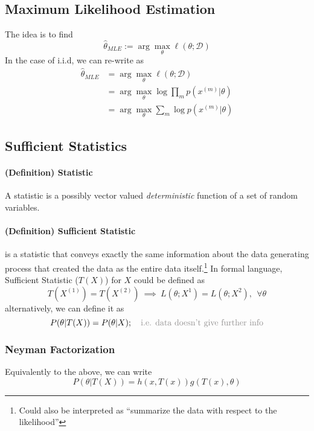 \documentclass[11pt]{article}
\newcommand{\argmax}{\arg\max}
\begin{document}
\subsection{Maximum Likelihood Estimation}
The idea is to find
\begin{equation*}
    \hat{\theta}_{MLE} := \argmax_\theta \ell(\theta; \mathcal{D})
\end{equation*}
In the case of i.i.d, we can re-write as
\begin{align*}
    \hat{\theta}_{MLE} &= \argmax_\theta \ell(\theta; \mathcal{D})\\
    &= \argmax_\theta \log \prod_{m} p\left(x^{(m)} | \theta\right) \\
    &= \argmax_\theta\sum_{m} \log p\left(x^{(m)} | \theta\right)
\end{align*}

\subsection{Sufficient Statistics}
\paragraph{(Definition) Statistic}
A statistic is a possibly vector valued \textit{deterministic} function of a set of random variables.

\paragraph{(Definition) Sufficient Statistic} 
is a statistic that conveys exactly the same information about the data generating process that created the data as the entire data itself.\footnote{Could also be interpreted as ``summarize the data with respect to the likelihood''} In formal language, Sufficient Statistic ($T(X)$) for $X$ could be defined as
\begin{equation*}
    T(X^{(1)}) = T(X^{(2)})~ \implies~ L(\theta; X^{1}) = L(\theta; X^{2}), ~~\forall \theta
\end{equation*}
alternatively, we can define it as
\begin{equation*}
    P(\theta | T(X)) = P(\theta | X); ~~~\text{\color{Gray} i.e. data doesn't give further info}
\end{equation*}
\subsubsection{Neyman Factorization}
Equivalently to the above, we can write
\begin{equation*}
    P(\theta | T(X))=h(x, T(x)) g(T(x), \theta)
\end{equation*}
\end{document}
